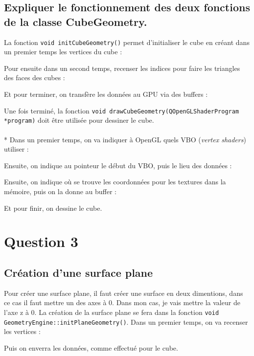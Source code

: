 \documentclass[a4paper,11pt]{report}
\begin{document}
	\subsection{Expliquer le fonctionnement des deux fonctions de la classe CubeGeometry.}
	    La fonction {\lstinline{void initCubeGeometry()}} permet d'initialiser le cube en créant dans un premier temps les vertices du cube :
    
    Pour ensuite dans un second temps, recenser les indices pour faire les triangles des faces des cubes :
    
    Et pour terminer, on transfère les données au GPU via des buffers :
    
    Une fois terminé, la fonction {\lstinline{void drawCubeGeometry(QOpenGLShaderProgram *program)}} doit être utilisée pour dessiner le cube.\\ \\*
    Dans un premier temps, on va indiquer à OpenGL quels VBO ({\it{vertex shaders}}) utiliser :
    
    Ensuite, on indique au pointeur le début du VBO, puis le lieu des données :
    
    \pagebreak
    
    Ensuite, on indique où se trouve les coordonnées pour les textures dans la mémoire, puis on la donne au buffer :
    
    
    Et pour finir, on dessine le cube.
    
	
	\pagebreak
	\section{Question 3}
	\subsection{Création d'une surface plane}
	  Pour créer une surface plane, il faut créer une surface en deux dimentions, dans ce cas il faut mettre un des axes à 0. Dans mon cas, je vais mettre la valeur de l'axe z à 0. La création de la surface plane se fera dans la fonction \lstinline{void GeometryEngine::initPlaneGeometry()}. Dans un premier temps, on va recenser les vertices :
	  
	  Puis on enverra les données, comme effectué pour le cube.
    	
\end{document}
